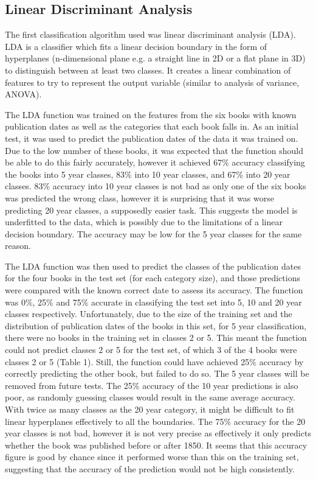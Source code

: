 \documentclass[11pt,a4paper,reqno]{amsart}
\begin{document}
\subsection{Linear Discriminant Analysis}
The first classification algorithm used was linear discriminant analysis (LDA). LDA is a classifier which fits a linear decision boundary in the form of hyperplanes (n-dimensional plane e.g. a straight line in 2D or a flat plane in 3D) to distinguish between at least two classes. It creates a linear combination of features to try to represent the output variable (similar to analysis of variance, ANOVA). 

The LDA function was trained on the features from the six books with known publication dates as well as the categories that each book falls in. As an initial test, it was used to predict the publication dates of the data it was trained on. Due to the low number of these books, it was expected that the function should be able to do this fairly accurately, however it achieved 67\% accuracy classifying the books into 5 year classes, 83\% into 10 year classes, and 67\% into 20 year classes. 83\% accuracy into 10 year classes is not bad as only one of the six books was predicted the wrong class, however it is surprising that it was worse predicting 20 year classes, a supposedly easier task. This suggests the model is underfitted to the data, which is possibly due to the limitations of a linear decision boundary. The accuracy may be low for the 5 year classes for the same reason.

The LDA function was then used to predict the classes of the publication dates for the four books in the test set (for each category size), and those predictions were compared with the known correct date to assess its accuracy. The function was 0\%, 25\% and 75\% accurate in classifying the test set into 5, 10 and 20 year classes respectively. Unfortunately, due to the size of the training set and the distribution of publication dates of the books in this set, for 5 year classification, there were no books in the training set in classes 2 or 5. This meant the function could not predict classes 2 or 5 for the test set, of which 3 of the 4 books were classes 2 or 5 (Table 1). Still, the function could have achieved 25\% accuracy by correctly predicting the other book, but failed to do so. The 5 year classes will be removed from future tests. The 25\% accuracy of the 10 year predictions is also poor, as randomly guessing classes would result in the same average accuracy. With twice as many classes as the 20 year category, it might be difficult to fit linear hyperplanes effectively to all the boundaries. The 75\% accuracy for the 20 year classes is not bad, however it is not very precise as effectively it only predicts whether the book was published before or after 1850. It seems that this accuracy figure is good by chance since it performed worse than this on the training set, suggesting that the accuracy of the prediction would not be high consistently.
\end{document}
